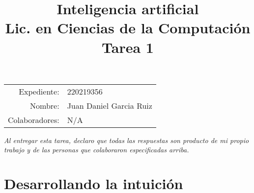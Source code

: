 \documentclass[11pt,letterpaper]{article}
\title{%
  \bfseries
  Inteligencia artificial\\%
  Lic. en Ciencias de la Computación\\%
  Tarea 1
}
\date{}
\begin{document}
\maketitle

\vspace{-2.5cm}
\begin{center}
  \begin{tabular}{rl}
    Expediente: & 220219356\\
    Nombre: & Juan Daniel Garcia Ruiz\\
    Colaboradores: & N/A\end{tabular}
\end{center}

{\itshape Al entregar esta tarea, declaro que todas las respuestas son
  producto de mi propio trabajo y de las personas que colaboraron
  especificadas arriba.}

\section*{Desarrollando la intuición}
\end{document}
